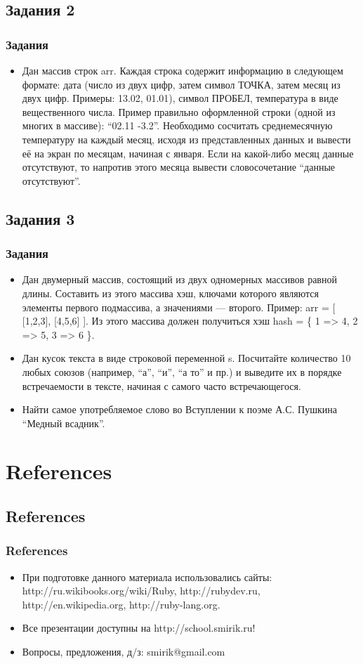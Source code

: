 \documentclass[compress,red]{beamer}
\begin{document}
\subsection{Задания 2}
\begin{frame}
  \frametitle{Задания}
  \begin{itemize}
    \item Дан массив строк arr. Каждая строка содержит информацию в следующем формате: дата (число из двух цифр, затем символ ТОЧКА, затем месяц из двух цифр. Примеры: 13.02, 01.01), символ ПРОБЕЛ, температура в виде вещественного числа. Пример правильно оформленной строки (одной из многих в массиве): ``02.11 -3.2''. Необходимо сосчитать среднемесячную температуру на каждый месяц, исходя из представленных данных и вывести её на экран по месяцам, начиная с января. Если на какой-либо месяц данные отсутствуют, то напротив этого месяца вывести словосочетание ``данные отсутствуют''.
  \end{itemize}
\end{frame}

\subsection{Задания 3}
\begin{frame}
  \frametitle{Задания}
  \begin{itemize}
    \item Дан двумерный массив, состоящий из двух одномерных массивов равной длины. Составить из этого массива хэш, ключами которого являются элементы первого подмассива, а значениями --- второго. Пример: arr = [ [1,2,3], [4,5,6] ]. Из этого массива должен получиться хэш hash = \{ 1 => 4, 2 => 5, 3 => 6 \}.
    \item Дан кусок текста в виде строковой переменной s. Посчитайте количество 10 любых союзов (например, ``а'', ``и'', ``а то'' и пр.) и выведите их в порядке встречаемости в тексте, начиная с самого часто встречающегося.
    \item Найти самое употребляемое слово во Вступлении к поэме А.С. Пушкина ``Медный всадник''.
  \end{itemize}
\end{frame}

\section{References}
\subsection{References}
\begin{frame}[fragile]
  \frametitle{References}
  \begin{itemize}
    \item При подготовке данного материала использовались сайты: http://ru.wikibooks.org/wiki/Ruby, http://rubydev.ru, http://en.wikipedia.org, http://ruby-lang.org.
    \item Все презентации доступны на http://school.smirik.ru!
    \item Вопросы, предложения, д/з: smirik@gmail.com
  \end{itemize}
\end{frame}
\end{document}
